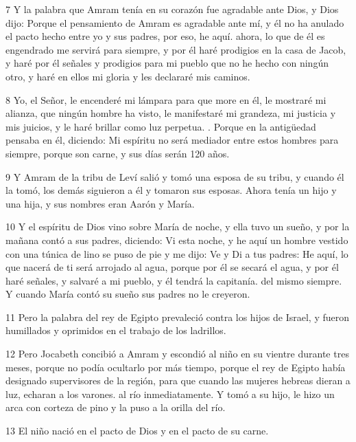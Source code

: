 \par 7 Y la palabra que Amram tenía en su corazón fue agradable ante Dios, y Dios dijo: Porque el pensamiento de Amram es agradable ante mí, y él no ha anulado el pacto hecho entre yo y sus padres, por eso, he aquí. ahora, lo que de él es engendrado me servirá para siempre, y por él haré prodigios en la casa de Jacob, y haré por él señales y prodigios para mi pueblo que no he hecho con ningún otro, y haré en ellos mi gloria y les declararé mis caminos.

\par 8 Yo, el Señor, le encenderé mi lámpara para que more en él, le mostraré mi alianza, que ningún hombre ha visto, le manifestaré mi grandeza, mi justicia y mis juicios, y le haré brillar como luz perpetua. . Porque en la antigüedad pensaba en él, diciendo: Mi espíritu no será mediador entre estos hombres para siempre, porque son carne, y sus días serán 120 años.

\par 9 Y Amram de la tribu de Leví salió y tomó una esposa de su tribu, y cuando él la tomó, los demás siguieron a él y tomaron sus esposas. Ahora tenía un hijo y una hija, y sus nombres eran Aarón y María.

\par 10 Y el espíritu de Dios vino sobre María de noche, y ella tuvo un sueño, y por la mañana contó a sus padres, diciendo: Vi esta noche, y he aquí un hombre vestido con una túnica de lino se puso de pie y me dijo: Ve y Di a tus padres: He aquí, lo que nacerá de ti será arrojado al agua, porque por él se secará el agua, y por él haré señales, y salvaré a mi pueblo, y él tendrá la capitanía. del mismo siempre. Y cuando María contó su sueño sus padres no le creyeron.

\par 11 Pero la palabra del rey de Egipto prevaleció contra los hijos de Israel, y fueron humillados y oprimidos en el trabajo de los ladrillos.

\par 12 Pero Jocabeth concibió a Amram y escondió al niño en su vientre durante tres meses, porque no podía ocultarlo por más tiempo, porque el rey de Egipto había designado supervisores de la región, para que cuando las mujeres hebreas dieran a luz, echaran a los varones. al río inmediatamente. Y tomó a su hijo, le hizo un arca con corteza de pino y la puso a la orilla del río.

\par 13 El niño nació en el pacto de Dios y en el pacto de su carne.

